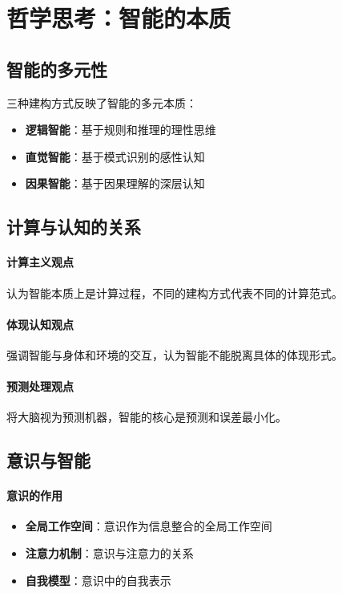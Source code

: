 \section{哲学思考：智能的本质}

\subsection{智能的多元性}

三种建构方式反映了智能的多元本质：

\begin{itemize}
\item \textbf{逻辑智能}：基于规则和推理的理性思维
\item \textbf{直觉智能}：基于模式识别的感性认知
\item \textbf{因果智能}：基于因果理解的深层认知
\end{itemize}

\subsection{计算与认知的关系}

\paragraph{计算主义观点}
认为智能本质上是计算过程，不同的建构方式代表不同的计算范式。

\paragraph{体现认知观点}
强调智能与身体和环境的交互，认为智能不能脱离具体的体现形式。

\paragraph{预测处理观点}
将大脑视为预测机器，智能的核心是预测和误差最小化。

\subsection{意识与智能}

\paragraph{意识的作用}
\begin{itemize}
\item \textbf{全局工作空间}：意识作为信息整合的全局工作空间
\item \textbf{注意力机制}：意识与注意力的关系
\item \textbf{自我模型}：意识中的自我表示
\end{itemize}

